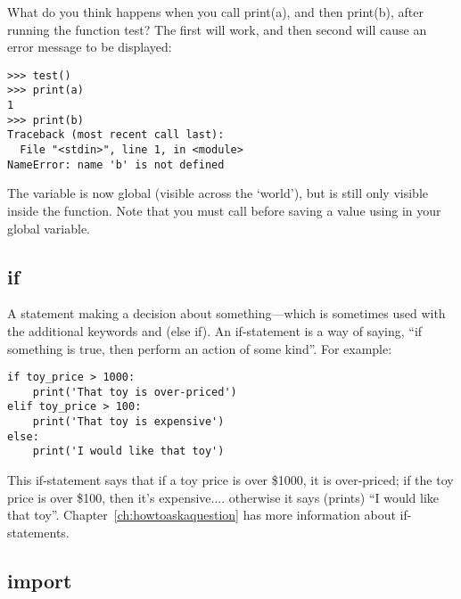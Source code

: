 What do you think happens when you call print(a), and then print(b), after running the function test?  The first will work, and then second will cause an error message to be displayed:

\begin{Verbatim}[frame=single]
>>> test()
>>> print(a)
1
>>> print(b)
Traceback (most recent call last):
  File "<stdin>", line 1, in <module>
NameError: name 'b' is not defined
\end{Verbatim}

The variable  is now global (visible across the `world'), but  is still only visible inside the function.  Note that you must call  before saving a value using in your global variable.

\subsection*{if}

A statement making a decision about something---which is sometimes used with the additional keywords  and  (else if).  An if-statement is a way of saying, ``if something is true, then perform an action of some kind''.  For example:

\begin{Verbatim}[frame=single]
if toy_price > 1000:
    print('That toy is over-priced')
elif toy_price > 100:
    print('That toy is expensive')
else:
    print('I would like that toy')
\end{Verbatim}

This if-statement says that if a toy price is over \$1000, it is over-priced; if the toy price is over \$100, then it's expensive.... otherwise it says (prints) ``I would like that toy''. Chapter~\ref{ch:howtoaskaquestion} has more information about if-statements.

\subsection*{import}


